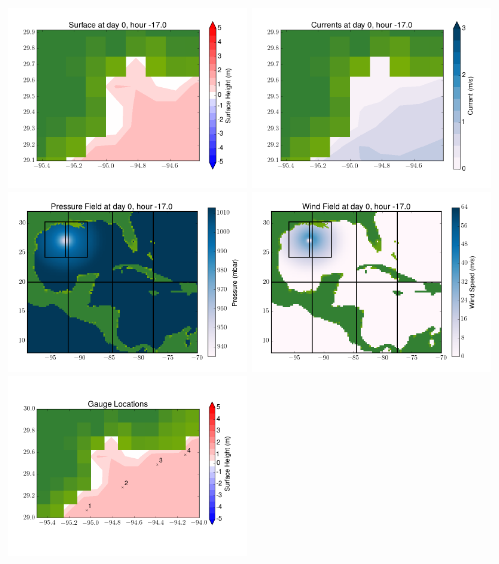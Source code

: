 \documentclass[11pt]{article}
\begin{document}
\includegraphics[width=0.475\textwidth]{frame0055fig6.png}
\vskip 10pt 
\includegraphics[width=0.475\textwidth]{frame0055fig7.png}
\includegraphics[width=0.475\textwidth]{frame0055fig8.png}
\vskip 10pt 
\includegraphics[width=0.475\textwidth]{frame0055fig9.png}
\includegraphics[width=0.475\textwidth]{frame0055fig10.png}
\end{document}
